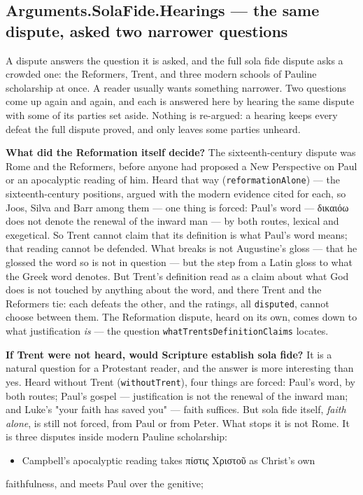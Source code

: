 \documentclass[11pt]{article}
\begin{document}
\subsection*{Arguments.SolaFide.Hearings — the same dispute, asked two narrower questions}
A dispute answers the question it is asked, and the full sola fide dispute asks a crowded one: the Reformers, Trent, and three modern schools of Pauline scholarship at once. A reader usually wants something narrower. Two questions come up again and again, and each is answered here by hearing the same dispute with some of its parties set aside. Nothing is re-argued: a hearing keeps every defeat the full dispute proved, and only leaves some parties unheard.

\textbf{What did the Reformation itself decide?} The sixteenth-century dispute was Rome and the Reformers, before anyone had proposed a New Perspective on Paul or an apocalyptic reading of him. Heard that way (\texttt{reformation\allowbreak{}Alone}) — the sixteenth-century positions, argued with the modern evidence cited for each, so Joos, Silva and Barr among them — one thing is forced: Paul's word — δικαιόω does not denote the renewal of the inward man — by both routes, lexical and exegetical. So Trent cannot claim that its definition is what Paul's word means; that reading cannot be defended. What breaks is not Augustine's gloss — that he glossed the word so is not in question — but the step from a Latin gloss to what the Greek word denotes. But Trent's definition read as a claim about what God does is not touched by anything about the word, and there Trent and the Reformers tie: each defeats the other, and the ratings, all \texttt{disputed}, cannot choose between them. The Reformation dispute, heard on its own, comes down to what justification \emph{is} — the question \texttt{what\allowbreak{}Trents\allowbreak{}Definition\allowbreak{}Claims} locates.

\textbf{If Trent were not heard, would Scripture establish sola fide?} It is a natural question for a Protestant reader, and the answer is more interesting than yes. Heard without Trent (\texttt{without\allowbreak{}Trent}), four things are forced: Paul's word, by both routes; Paul's gospel — justification is not the renewal of the inward man; and Luke's "your faith has saved you" — faith suffices. But sola fide itself, \emph{faith alone}, is still not forced, from Paul or from Peter. What stops it is not Rome. It is three disputes inside modern Pauline scholarship:

\begin{itemize}
  \item Campbell's apocalyptic reading takes πίστις Χριστοῦ as Christ's own
\end{itemize}
  faithfulness, and meets Paul over the genitive;
\end{document}
